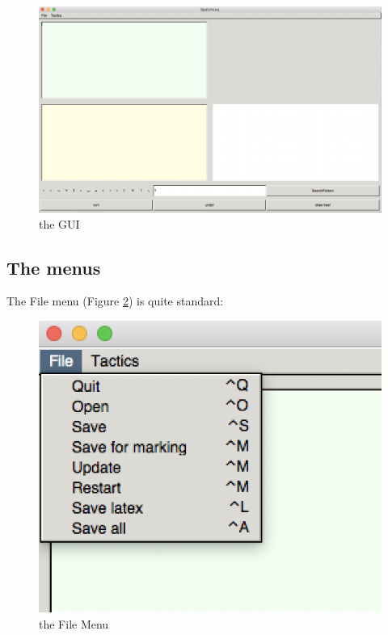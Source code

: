 \begin{figure}[h!]
\includegraphics[scale=0.3]{Installation/main.png}
\caption{the GUI}\label{first look}
\end{figure}
\subsection{The menus}

The File menu (Figure \ref{file}) is quite standard:

\begin{figure}[h!]
\includegraphics[scale=0.5]{Installation/menu1.png}


\caption{the File  Menu}\label{file}
\end{figure}

